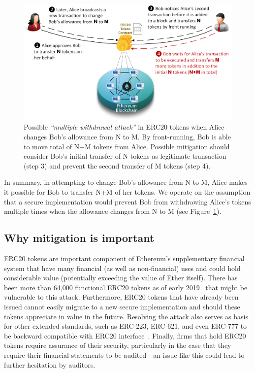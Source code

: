 \begin{figure}[ht]
	\centering
	\includegraphics[width=1.0\linewidth]{figures/multiple_withdrawal_02.png}
	\caption{Possible \textit{``multiple withdrawal attack''} in ERC20 tokens when Alice changes Bob's allowance from N to M. By front-running, Bob is able to move total of N+M tokens from Alice. Possible mitigation should consider Bob's initial transfer of N tokens as legitimate transaction (step 3) and prevent the second transfer of M tokens (step 4).\label{fig:mwa}}
\end{figure}

In summary, in attempting to change Bob's allowance from N to M, Alice makes it possible for Bob to transfer N+M of her tokens. We operate on the assumption that a secure implementation would prevent Bob from withdrawing Alice's tokens multiple times when the allowance changes from N to M (see Figure~\ref{fig:mwa}).

\subsection{Why mitigation is important}
ERC20 tokens are important component of Ethereum's supplementary financial system that have many financial (as well as non-financial) uses and could hold considerable value (potentially exceeding the value of Ether itself). There has been more than 64,000 functional ERC20 tokens as of early 2019~\cite{victormeasuring} that might be vulnerable to this attack. Furthermore, ERC20 tokens that have already been issued cannot easily migrate to a new secure implementation and should these tokens appreciate in value in the future. Resolving the attack also serves as basis for other extended standards, such as ERC-223, ERC-621, and even ERC-777 to be backward compatible with ERC20 interface~\cite{frowis2018detecting}. Finally, firms that hold ERC20 tokens require assurance of their security, particularly in the case that they require their financial statements to be audited---an issue like this could lead to further hesitation by auditors.

